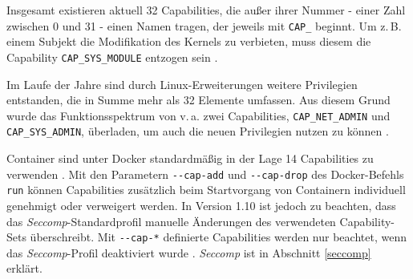 \documentclass[../main.tex]{subfiles}
\begin{document}
			Insgesamt existieren aktuell 32 Capabilities, die außer ihrer Nummer - einer Zahl zwischen 0 und 31 - einen Namen tragen, der jeweils mit \texttt{CAP\_} beginnt. Um z.\,B. einem Subjekt die Modifikation des Kernels zu verbieten, muss diesem die Capability \texttt{CAP\_SYS\_MODULE} entzogen sein \cite[S.42]{SELinuxApparmor}.

			Im Laufe der Jahre sind durch Linux-Erweiterungen weitere Privilegien entstanden, die in Summe mehr als 32 Elemente umfassen. Aus diesem Grund wurde das Funktionsspektrum von v.\,a. zwei Capabilities, \texttt{CAP\_NET\_ADMIN} und \texttt{CAP\_SYS\_ADMIN}, überladen, um auch die neuen Privilegien nutzen zu können \cite[S.40f.]{SELinuxApparmor}.

			Container sind unter Docker standardmäßig in der Lage 14 Capabilities zu verwenden \cite{githubCapabilities}. Mit den Parametern \texttt{-{}-cap-add} und \texttt{-{}-cap-drop} des Docker-Befehls \texttt{run} können Capabilities zusätzlich beim Startvorgang von Containern individuell genehmigt oder verweigert werden. In Version 1.10 ist jedoch zu beachten, dass das \emph{Seccomp}-Standardprofil manuelle Änderungen des verwendeten Capability-Sets überschreibt. Mit \texttt{-{}-cap-*} definierte Capabilities werden nur beachtet, wenn das \emph{Seccomp}-Profil deaktiviert wurde \cite{dockerRun}. \emph{Seccomp} ist in Abschnitt \ref{seccomp} erklärt.




\end{document}

